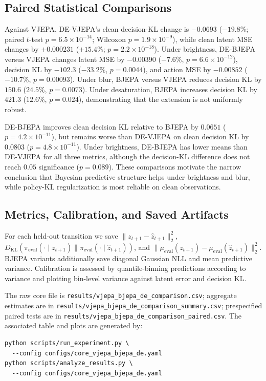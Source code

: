 \documentclass[10pt,twocolumn]{article}
\theoremstyle{tightstyle}
\begin{document}
\subsection{Paired Statistical Comparisons}

Against VJEPA, DE-VJEPA's clean decision-KL change is $-0.0693$
($-19.8\%$; paired $t$-test $p=6.5{\times}10^{-14}$; Wilcoxon
$p=1.9{\times}10^{-9}$), while clean latent MSE changes by $+0.000231$
($+15.4\%$; $p=2.2{\times}10^{-18}$). Under brightness, DE-BJEPA versus VJEPA
changes latent MSE by $-0.00390$ ($-7.6\%$, $p=6.6{\times}10^{-12}$), decision
KL by $-102.3$ ($-33.2\%$, $p=0.0044$), and action MSE by $-0.00852$
($-10.7\%$, $p=0.00093$). Under blur, BJEPA versus VJEPA reduces decision KL by
$150.6$ ($24.5\%$, $p=0.0073$). Under desaturation, BJEPA increases decision KL
by $421.3$ ($12.6\%$, $p=0.024$), demonstrating that the extension is not
uniformly robust.

DE-BJEPA improves clean decision KL relative to BJEPA by $0.0651$
($p=4.2{\times}10^{-11}$), but remains worse than DE-VJEPA on clean decision KL
by $0.0803$ ($p=4.8{\times}10^{-11}$). Under brightness, DE-BJEPA has lower
means than DE-VJEPA for all three metrics, although the decision-KL difference
does not reach $0.05$ significance ($p=0.089$). These comparisons motivate the
narrow conclusion that Bayesian predictive structure helps under brightness and
blur, while policy-KL regularization is most reliable on clean observations.

\subsection{Metrics, Calibration, and Saved Artifacts}

For each held-out transition we save
$\|z_{t+1}-\hat z_{t+1}\|_2^2$,
$D_{\mathrm{KL}}(\pi_{\mathrm{eval}}(\cdot\mid z_{t+1})\|
\pi_{\mathrm{eval}}(\cdot\mid\hat z_{t+1}))$, and
$\|\mu_{\mathrm{eval}}(z_{t+1})-\mu_{\mathrm{eval}}(\hat z_{t+1})\|_2^2$.
BJEPA variants additionally save diagonal Gaussian NLL and mean predictive
variance. Calibration is assessed by quantile-binning predictions according to
variance and plotting bin-level variance against latent error and decision KL.

The raw core file is
\texttt{results/vjepa\_bjepa\_de\_comparison.csv}; aggregate estimates are in
\texttt{results/vjepa\_bjepa\_de\_comparison\_summary.csv}; prespecified paired
tests are in
\texttt{results/vjepa\_bjepa\_de\_comparison\_paired.csv}. The associated table
and plots are generated by:
\begin{verbatim}
python scripts/run_experiment.py \
  --config configs/core_vjepa_bjepa_de.yaml
python scripts/analyze_results.py \
  --config configs/core_vjepa_bjepa_de.yaml
\end{verbatim}
\end{document}
